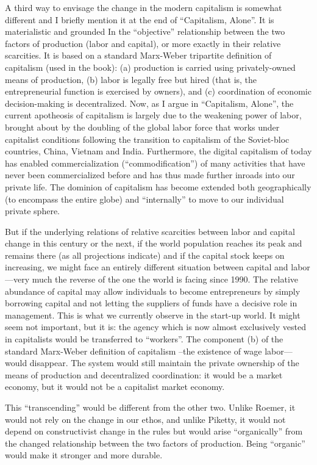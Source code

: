 \documentclass[
]{book}
\begin{document}
A third way to envisage the change in the modern capitalism is somewhat different and I briefly mention it at the end of ``Capitalism, Alone''. It is materialistic and grounded In the ``objective'' relationship between the two factors of production (labor and capital), or more exactly in their relative scarcities. It is based on a standard Marx-Weber tripartite definition of capitalism (used in the book): (a) production is carried using privately-owned means of production, (b) labor is legally free but hired (that is, the entrepreneurial function is exercised by owners), and (c) coordination of economic decision-making is decentralized. Now, as I argue in ``Capitalism, Alone'', the current apotheosis of capitalism is largely due to the weakening power of labor, brought about by the doubling of the global labor force that works under capitalist conditions following the transition to capitalism of the Soviet-bloc countries, China, Vietnam and India. Furthermore, the digital capitalism of today has enabled commercialization (``commodification'') of many activities that have never been commercialized before and has thus made further inroads into our private life. The dominion of capitalism has become extended both geographically (to encompass the entire globe) and ``internally'' to move to our individual private sphere.

But if the underlying relations of relative scarcities between labor and capital change in this century or the next, if the world population reaches its peak and remains there (as all projections indicate) and if the capital stock keeps on increasing, we might face an entirely different situation between capital and labor---very much the reverse of the one the world is facing since 1990. The relative abundance of capital may allow individuals to become entrepreneurs by simply borrowing capital and not letting the suppliers of funds have a decisive role in management. This is what we currently observe in the start-up world. It might seem not important, but it is: the agency which is now almost exclusively vested in capitalists would be transferred to ``workers''. The component (b) of the standard Marx-Weber definition of capitalism --the existence of wage labor---would disappear. The system would still maintain the private ownership of the means of production and decentralized coordination: it would be a market economy, but it would not be a capitalist market economy.

This ``transcending'' would be different from the other two. Unlike Roemer, it would not rely on the change in our ethos, and unlike Piketty, it would not depend on constructivist change in the rules but would arise ``organically'' from the changed relationship between the two factors of production. Being ``organic'' would make it stronger and more durable.
\end{document}
